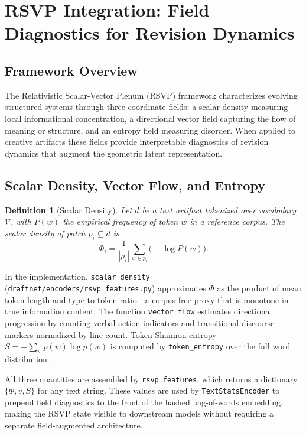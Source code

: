 \documentclass[12pt,a4paper]{article}
\theoremstyle{draftthm}
\newtheorem{definition}{Definition}[section]
\newcommand{\code}[1]{\texttt{\small #1}}
\begin{document}
\section{RSVP Integration: Field Diagnostics for Revision Dynamics}

\subsection{Framework Overview}

The Relativistic Scalar-Vector Plenum (RSVP) framework characterizes evolving structured systems through three coordinate fields: a scalar density measuring local informational concentration, a directional vector field capturing the flow of meaning or structure, and an entropy field measuring disorder. When applied to creative artifacts these fields provide interpretable diagnostics of revision dynamics that augment the geometric latent representation.

\subsection{Scalar Density, Vector Flow, and Entropy}

\begin{definition}[Scalar Density]
  Let $d$ be a text artifact tokenized over vocabulary $\mathcal{V}$, with $P(w)$ the empirical frequency of token $w$ in a reference corpus. The \emph{scalar density} of patch $p_i \subseteq d$ is
  \begin{equation}
    \Phi_i = \frac{1}{|p_i|} \sum_{w \in p_i} \bigl(-\log P(w)\bigr).
    \label{eq:scalar-density}
  \end{equation}
\end{definition}

In the implementation, \code{scalar\_density} (\code{draftnet/encoders/rsvp\_features.py}) approximates $\Phi$ as the product of mean token length and type-to-token ratio---a corpus-free proxy that is monotone in true information content. The function \code{vector\_flow} estimates directional progression by counting verbal action indicators and transitional discourse markers normalized by line count. Token Shannon entropy $S = -\sum_w p(w) \log p(w)$ is computed by \code{token\_entropy} over the full word distribution.

All three quantities are assembled by \code{rsvp\_features}, which returns a dictionary $\{\Phi, v, S\}$ for any text string. These values are used by \code{TextStatsEncoder} to prepend field diagnostics to the front of the hashed bag-of-words embedding, making the RSVP state visible to downstream models without requiring a separate field-augmented architecture.
\end{document}
